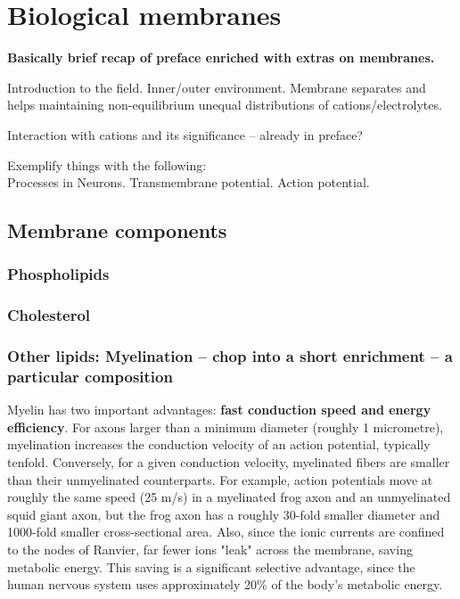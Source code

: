 \chapter{Biological membranes}
\label{chap:intro}

 \textbf{Basically brief recap of preface enriched with extras on membranes.}

 Introduction to the field. 
 Inner/outer environment. 
 Membrane separates and helps maintaining non-equilibrium unequal distributions of cations/electrolytes. 

 Interaction with cations and its significance -- already in preface?

 Exemplify things with the following: \\
 Processes in Neurons. 
 Transmembrane potential. 
 Action potential. 

\section{Membrane components}

\subsection{Phospholipids}

\subsection{Cholesterol}

\subsection{Other lipids: Myelination -- chop into a short enrichment -- a particular composition}
Myelin has two important advantages:\textbf{ fast conduction speed and energy efficiency}. For axons larger than a minimum diameter (roughly 1 micrometre), myelination increases the conduction velocity of an action potential, typically tenfold. Conversely, for a given conduction velocity, myelinated fibers are smaller than their unmyelinated counterparts. For example, action potentials move at roughly the same speed (25 m/s) in a myelinated frog axon and an unmyelinated squid giant axon, but the frog axon has a roughly 30-fold smaller diameter and 1000-fold smaller cross-sectional area. Also, since the ionic currents are confined to the nodes of Ranvier, far fewer ions "leak" across the membrane, saving metabolic energy. This saving is a significant selective advantage, since the human nervous system uses approximately 20\% of the body's metabolic energy.

